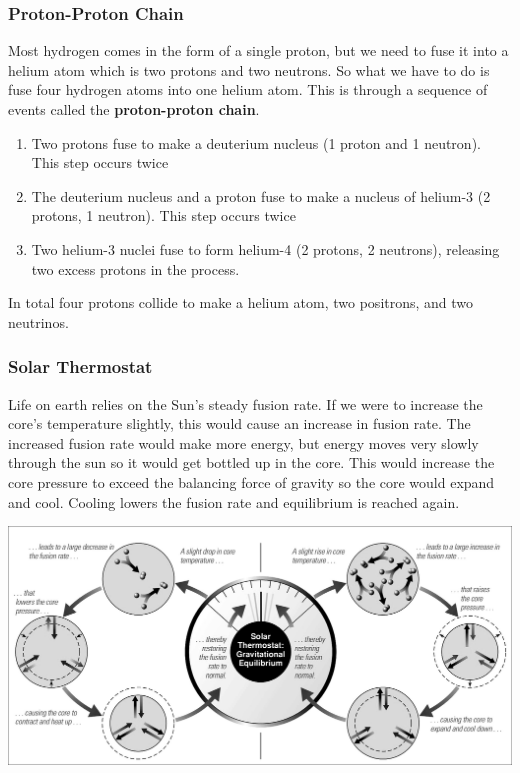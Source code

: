\documentclass[12pt]{article}
\begin{document}
\subsubsection{Proton-Proton Chain}
Most hydrogen comes in the form of a single proton, but we need to fuse it into a helium atom which is two protons and two neutrons. So what we have to do is fuse four hydrogen atoms into one helium atom. This is through a sequence of events called the \textbf{proton-proton chain}.
\begin{enumerate}
\item Two protons fuse to make a deuterium nucleus (1 proton and 1 neutron). This step occurs twice
\item The deuterium nucleus and a proton fuse to make a nucleus of helium-3 (2 protons, 1 neutron). This step occurs twice
\item Two helium-3 nuclei fuse to form helium-4 (2 protons, 2 neutrons), releasing two excess protons in the process.
\end{enumerate}
In total four protons collide to make a helium atom, two positrons, and two neutrinos.

\subsubsection{Solar Thermostat}
Life on earth relies on the Sun's steady fusion rate. If we were to increase the core's temperature slightly, this would cause an increase in fusion rate. The increased fusion rate would make more energy, but energy moves very slowly through the sun so it would get bottled up in the core. This would increase the core pressure to exceed the balancing force of gravity so the core would expand and cool. Cooling lowers the fusion rate and equilibrium is reached again.

\includegraphics[scale=0.5]{solarThermostat}
\end{document}
